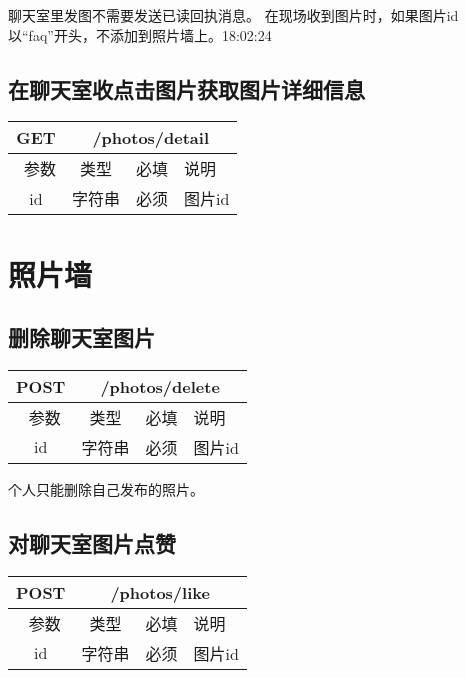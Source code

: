聊天室里发图不需要发送已读回执消息。
在现场收到图片时，如果图片id以“faq”开头，不添加到照片墙上。18:02:24


\subsection{在聊天室收点击图片获取图片详细信息}

\begin{table}[H]
   \begin{center}
\begin{tabular}{|c|c|c|p{12cm}|}
\hline
GET & \multicolumn{3}{|c|}{/photos/detail} \\
\hline\hline
 \  参数  & 类型 & 必填 &  说明  \\
  \hline
 id  & 字符串 & 必须 & 图片id\\
\hline
\end{tabular}
   \end{center}
\end{table}



\section{照片墙}

\subsection{删除聊天室图片}

\begin{table}[H]
   \begin{center}
\begin{tabular}{|c|c|c|p{12cm}|}
\hline
POST & \multicolumn{3}{|c|}{/photos/delete} \\
\hline\hline
 \  参数  & 类型 & 必填 &  说明  \\
  \hline
 id  & 字符串 & 必须 & 图片id\\
\hline
\end{tabular}
   \end{center}
\end{table}
个人只能删除自己发布的照片。



\subsection{对聊天室图片点赞}

\begin{table}[H]
   \begin{center}
\begin{tabular}{|c|c|c|p{12cm}|}
\hline
POST & \multicolumn{3}{|c|}{/photos/like} \\
\hline\hline
 \  参数  & 类型 & 必填 &  说明  \\
  \hline
 id  & 字符串 & 必须 & 图片id\\
\hline
\end{tabular}
   \end{center}
\end{table}

